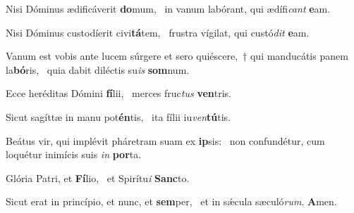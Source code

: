 \item Nisi Dóminus ædificáverit \textbf{do}mum,~\psstar{} in vanum labórant, qui ædífi\textit{cant} \textbf{e}am.

\item Nisi Dóminus custodíerit civi\textbf{tá}tem,~\psstar{} frustra vígilat, qui custó\textit{dit} \textbf{e}am.

\item Vanum est vobis ante lucem súrgere et sero quiéscere,~† qui manducátis panem la\textbf{bó}ris,~\psstar{} quia dabit diléctis su\textit{is} \textbf{som}num.

\item Ecce heréditas Dómini \textbf{fí}lii,~\psstar{} merces fruc\textit{tus} \textbf{ven}tris.

\item Sicut sagíttæ in manu pot\textbf{én}tis,~\psstar{} ita fílii iu\textit{ven}\textbf{tú}tis.

\item Beátus vir, qui implévit pháretram suam ex \textbf{ip}sis:~\psstar{} non confundétur, cum loquétur inimícis suis \textit{in} \textbf{por}ta.

\item Glória Patri, et \textbf{Fí}lio,~\psstar{} et Spirítu\textit{i} \textbf{Sanc}to.

\item Sicut erat in princípio, et nunc, et \textbf{sem}per,~\psstar{} et in sǽcula sæculó\textit{rum}. \textbf{A}men.